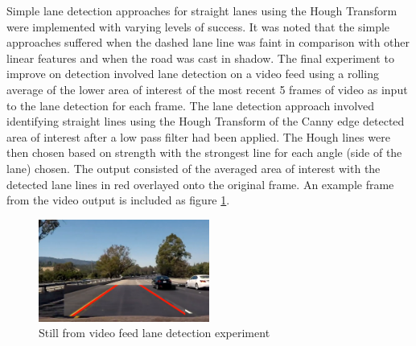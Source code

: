 \documentclass[]{aiaa-tc}%
\begin{document}
Simple lane detection approaches for straight lanes using the Hough Transform were implemented with varying levels of success. It was noted that the simple approaches suffered when the dashed lane line was faint in comparison with other linear features and when the road was cast in shadow. The final experiment to improve on detection involved lane detection on a video feed using a rolling average of the lower area of interest of the most recent 5 frames of video as input to the lane detection for each frame. The lane detection approach involved identifying straight lines using the Hough Transform of the Canny edge detected area of interest after a low pass filter had been applied. The Hough lines were then chosen based on strength with the strongest line for each angle (side of the lane) chosen. The output consisted of the averaged area of interest with the detected lane lines in red overlayed onto the original frame. An example frame from the video output is included as figure \ref{f:simpleLaneDetectionHough}.


\begin{figure} %
	\centering
	\includegraphics[width=0.5\textwidth, height=0.5\textwidth]{early_lane_detection_experiment.png}
	\caption{Still from video feed lane detection experiment}
	\label{f:simpleLaneDetectionHough}
\end{figure}
\end{document}
